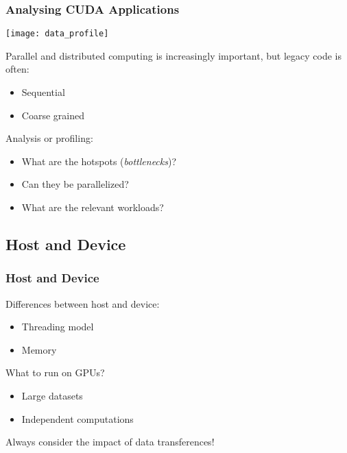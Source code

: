 \documentclass[10pt, compress]{beamer}
\begin{document}
\begin{frame}
    \frametitle{Analysing CUDA Applications}
    \begin{center}
        \texttt{[image: data\_profile]}
    \end{center}

    \alert{Parallel} and \alert{distributed} computing is
    increasingly important, but \alert{legacy code} is often:

    \begin{itemize}
        \item \alert{Sequential}

        \item \alert{Coarse grained}
    \end{itemize}


    Analysis or \alert{profiling}:

    \begin{itemize}
        \item What are the \alert{hotspots} (\textit{bottlenecks})?

        \item Can they be parallelized?

        \item What are the relevant \alert{workloads}?
    \end{itemize}
\end{frame}

\subsection{Host and Device}

\begin{frame}
    \frametitle{Host and Device}
    Differences between host and device:
    \begin{itemize}
        \item Threading model

        \item Memory
    \end{itemize}


    What to run on \alert{GPUs}?

    \begin{itemize}
        \item Large \alert{datasets}

        \item \alert{Independent} computations
    \end{itemize}


    Always consider the impact of \alert{data transferences}!
\end{frame}
\end{document}

